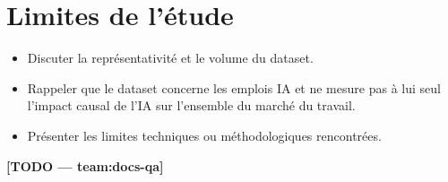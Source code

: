 \section{Limites de l'étude}
\begin{itemize}
  \item Discuter la représentativité et le volume du dataset.
  \item Rappeler que le dataset concerne les emplois IA et ne mesure pas à lui seul l'impact causal de l'IA sur l'ensemble du marché du travail.
  \item Présenter les limites techniques ou méthodologiques rencontrées.
\end{itemize}
\textbf{[TODO — team:docs-qa]}

